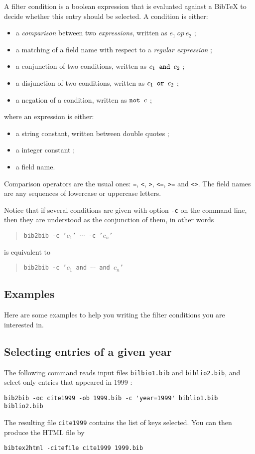 \documentclass[11pt,a4paper]{article}
\begin{document}
A filter condition is a boolean expression that is evaluated against
a BibTeX to decide whether this entry should be selected. A condition
is either:
\begin{itemize}
\item a \emph{comparison} between two \emph{expressions}, written as
  $e_1~op~e_2$ ; 
\item a matching of a field name with respect to a \emph{regular
    expression} ; 
\item a conjunction of two conditions, written as $c_1 \verb| and |
  c_2$ ;
\item a disjunction of two conditions, written as $c_1 \verb| or |
  c_2$ ;
\item a negation of a condition, written as $\verb|not | c$ ;
\end{itemize}
where an expression is either:
\begin{itemize}
\item a string constant, written between double quotes ;
\item a integer constant ;
\item a field name.
\end{itemize} 
Comparison operators are the usual ones: \texttt{=}, \texttt{<},
\texttt{>}, \texttt{<=}, \texttt{>=} and \texttt{<>}. The field names
are any sequences of lowercase or uppercase letters. 

Notice that if several conditions are given with option \verb|-c| on
the command line, then they are understood as the conjunction of them,
in other words
\begin{quote}
\texttt{bib2bib -c '$c_1$' $\cdots$ -c '$c_n$'}
\end{quote} 
is equivalent to
\begin{quote}
\texttt{bib2bib -c '$c_1$ and $\cdots$ and $c_n$'}
\end{quote} 

\subsection{Examples}

Here are some examples to help you writing the filter conditions you
are interested in.

\subsection{Selecting entries of a given year}

The following command reads input files \verb|bilbio1.bib| and
\verb|biblio2.bib|, and select only entries that appeared in 1999 :
\begin{verbatim}
bib2bib -oc cite1999 -ob 1999.bib -c 'year=1999' biblio1.bib
biblio2.bib 
\end{verbatim}
The resulting file \verb|cite1999| contains the list of keys
selected. You can then produce the HTML file by
\begin{verbatim}
bibtex2html -citefile cite1999 1999.bib
\end{verbatim}


\end{document}
